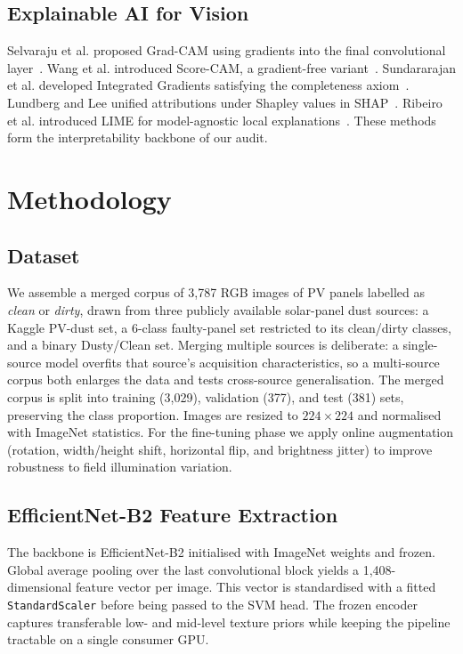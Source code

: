 \documentclass{IEEEtran}
\begin{document}
\subsection{Explainable AI for Vision}
Selvaraju et al. proposed Grad-CAM using gradients into the final convolutional layer~\cite{selvaraju2017grad}. Wang et al. introduced Score-CAM, a gradient-free variant~\cite{wang2020score}. Sundararajan et al. developed Integrated Gradients satisfying the completeness axiom~\cite{sundararajan2017axiomatic}. Lundberg and Lee unified attributions under Shapley values in SHAP~\cite{lundberg2017unified}. Ribeiro et al. introduced LIME for model-agnostic local explanations~\cite{ribeiro2016should}. These methods form the interpretability backbone of our audit.

\section{Methodology}

\subsection{Dataset}
We assemble a merged corpus of 3,787 RGB images of PV panels labelled as \emph{clean} or \emph{dirty}, drawn from three publicly available solar-panel dust sources: a Kaggle PV-dust set, a 6-class faulty-panel set restricted to its clean/dirty classes, and a binary Dusty/Clean set. Merging multiple sources is deliberate: a single-source model overfits that source's acquisition characteristics, so a multi-source corpus both enlarges the data and tests cross-source generalisation. The merged corpus is split into training (3,029), validation (377), and test (381) sets, preserving the class proportion. Images are resized to $224\times224$ and normalised with ImageNet statistics. For the fine-tuning phase we apply online augmentation (rotation, width/height shift, horizontal flip, and brightness jitter) to improve robustness to field illumination variation.

\subsection{EfficientNet-B2 Feature Extraction}
The backbone is EfficientNet-B2 initialised with ImageNet weights and frozen. Global average pooling over the last convolutional block yields a 1,408-dimensional feature vector per image. This vector is standardised with a fitted \texttt{StandardScaler} before being passed to the SVM head. The frozen encoder captures transferable low- and mid-level texture priors while keeping the pipeline tractable on a single consumer GPU.
\end{document}
